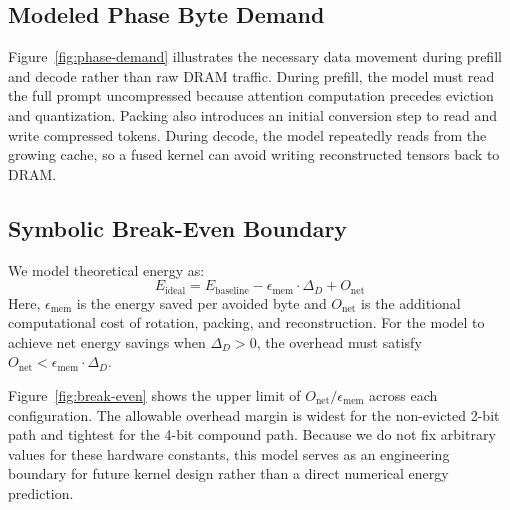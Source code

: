 \documentclass[sigconf,nonacm]{acmart}
\begin{document}
\subsection{Modeled Phase Byte Demand}

Figure~\ref{fig:phase-demand} illustrates the necessary data movement during prefill and decode rather than raw DRAM traffic. During prefill, the model must read the full prompt uncompressed because attention computation precedes eviction and quantization. Packing also introduces an initial conversion step to read and write compressed tokens. During decode, the model repeatedly reads from the growing cache, so a fused kernel can avoid writing reconstructed tensors back to DRAM.

\subsection{Symbolic Break-Even Boundary}

We model theoretical energy as:
\begin{equation}
E_\text{ideal} = E_\text{baseline} - \epsilon_\text{mem} \cdot \Delta_D + O_\text{net}
\end{equation}
Here, $\epsilon_\text{mem}$ is the energy saved per avoided byte and $O_\text{net}$ is the additional computational cost of rotation, packing, and reconstruction. For the model to achieve net energy savings when $\Delta_D > 0$, the overhead must satisfy $O_\text{net} < \epsilon_\text{mem} \cdot \Delta_D$.

Figure~\ref{fig:break-even} shows the upper limit of $O_\text{net}/\epsilon_\text{mem}$ across each configuration. The allowable overhead margin is widest for the non-evicted 2-bit path and tightest for the 4-bit compound path. Because we do not fix arbitrary values for these hardware constants, this model serves as an engineering boundary for future kernel design rather than a direct numerical energy prediction.
\end{document}
